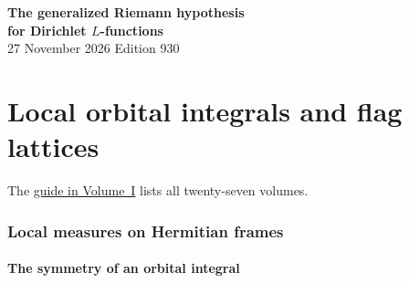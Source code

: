 \documentclass[a4paper,11pt]{article}
\theoremstyle{definition}
\theoremstyle{remark}
\numberwithin{equation}{section}
\begin{document}
\setcounter{part}{18}
\thispagestyle{plain}\begin{center}
{\LARGE\bfseries The generalized Riemann hypothesis\\[2pt]for Dirichlet \(L\)-functions}\\[6pt]
{\small 27 November 2026 \quad\textperiodcentered\quad Edition 930}\end{center}
\part{Local orbital integrals and flag lattices}\label{part:XIX}
\begin{abstract}\noindent We compute orbital integrals at finite places on Hermitian frames. At split auxiliary primes we compute the signed integral on each admissible core position and the elementary divisors for primitive terminal frequencies. We match the auxiliary compact row characters to the flag and determine the largest possible overlap of the original and transported auxiliary theta tests along the chain.\end{abstract}
\setcounter{section}{97}
\noindent The \hyperref[seriesguide]{guide in Volume~I} lists all twenty-seven volumes.
\begingroup\small\setlength{\parskip}{0pt}\tableofcontents\endgroup
\clearpage

\section{Local measures on Hermitian frames}\label{nav:g-IX-0}\label{nav:volume-XIX}

\subsection{The symmetry of an orbital integral}\label{nav:IX-00}
\label{sec:orbital133}
\end{document}
